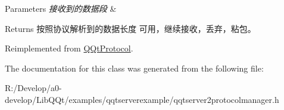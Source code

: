 \begin{DoxyParams}{Parameters}
{\em 接收到的数据段} & \\
\hline
\end{DoxyParams}
\begin{DoxyReturn}{Returns}
按照协议解析到的数据长度 可用，继续接收，丢弃，粘包。 
\end{DoxyReturn}


Reimplemented from \mbox{\hyperlink{class_q_qt_protocol_a00fd0c1ac23379ed3b9b25da9a34f39b}{Q\+Qt\+Protocol}}.



The documentation for this class was generated from the following file\+:\begin{DoxyCompactItemize}
\item 
R\+:/\+Develop/a0-\/develop/\+Lib\+Q\+Qt/examples/qqtserverexample/qqtserver2protocolmanager.\+h\end{DoxyCompactItemize}

